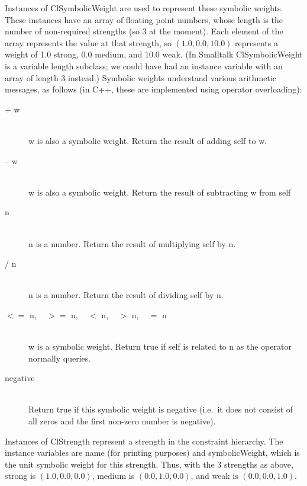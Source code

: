 \documentclass{article}
\begin{document}
Instances of {\sf ClSymbolicWeight} are used to represent these symbolic
weights.  These instances have an array of floating point numbers, whose
length is the number of non-required strengths (so 3 at the moment).  Each
element of the array represents the value at that strength, so $(1.0, 0.0,
10.0)$ represents a weight of 1.0 {\sf strong}, 0.0 {\sf medium}, and 10.0
{\sf weak}.  (In Smalltalk {\sf ClSymbolicWeight} is a variable length
subclass; we could have had an instance variable with an array of length 3
instead.)   Symbolic weights understand various arithmetic messages, as
follows (in C++, these are implemented using operator overloading):

\begin{description}

\item[{\sf + w}]  \ \\
{\sf w} is also a symbolic weight.
Return the result of adding {\sf self} to {\sf w}.  

\item[{\sf -- w}] \ \\
{\sf w} is also a symbolic weight.
Return the result of subtracting {\sf w} from {\sf self}

\item[{\sf * n}] \ \\
{\sf n} is a number.
Return the result of multiplying {\sf self} by {\sf n}.  

\item[{\sf / n}] \ \\
{\sf n} is a number.
Return the result of dividing {\sf self} by {\sf n}.  

\item[$<=$ {\sf  n}, ~ $>=$ {\sf n}, ~ $<$ {\sf n}, ~ $>$ {\sf n}, ~ $=$ {\sf n}] \ \\
{\sf w} is a symbolic weight.
Return true if {\sf self} is related to {\sf n} as the operator normally
queries.

\item[{\sf negative}] \ \\
Return true if this symbolic weight is negative
(i.e.\ it does not consist of all zeros and the first non-zero number is
negative). 

\end{description}

Instances of {\sf ClStrength} represent a strength in the constraint
hierarchy.  The instance variables are {\sf name} (for printing
purposes) and {\sf symbolicWeight}, which is the unit symbolic weight
for this strength.  Thus, with the 3 strengths as above, {\sf strong} is
$(1.0, 0.0, 0.0)$, {\sf medium} is $(0.0, 1.0, 0.0)$, and {\sf weak} is
$(0.0, 0.0, 1.0)$.
\end{document}
